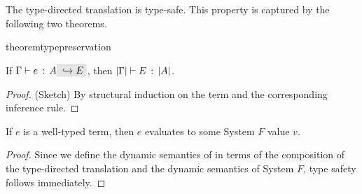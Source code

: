 The type-directed translation is type-safe. This property is captured
by the following two theorems.

\begin{restatable}{theorem}{typepreservation}
  \label{theorem:type-preservation}

  If $ \jtype \Gamma e A \yields E $,
  then $ \lvert \Gamma \rvert \vdash E \ \!:\! \ \lvert A \rvert $.
\end{restatable}

\begin{proof}
  (Sketch) By structural induction on the term and the corresponding
  inference rule.
\end{proof}

\begin{theorem}
  If $e$ is a well-typed \name term, then $e$ evaluates to some System $F$
  value $v$.
\end{theorem}

\begin{proof}
  Since we define the dynamic semantics of \name in terms of the composition of
  the type-directed translation and the dynamic semantics of System $F$, type safety follows immediately.
\end{proof}

